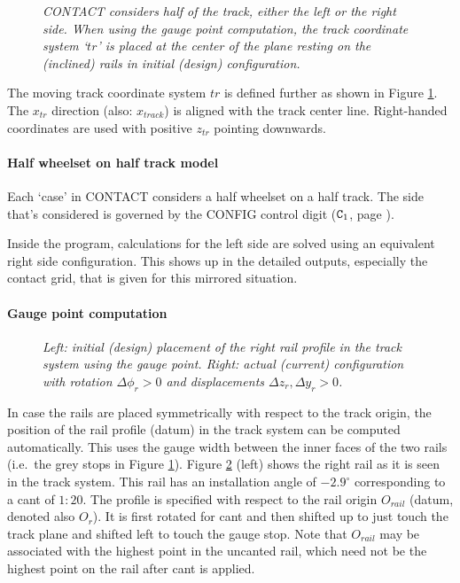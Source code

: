 \documentclass[12pt]{report}
\begin{document}
\begin{figure}[bt]
\centering
{}
\caption{\em CONTACT considers half of the track, either the left or the
        right side. When using the gauge point computation, the track
        coordinate system `$tr$' is placed at the center of the plane resting
        on the (inclined) rails in initial (design) configuration.}
\label{fig:track_coords}
\end{figure}

The moving track coordinate system $tr$ is defined further as shown in
Figure \ref{fig:track_coords}. The $x_{tr}$ direction (also: $x_{track}$) is
aligned with the track center line. Right-handed coordinates are used with
positive $z_{tr}$ pointing downwards.

\paragraph{Half wheelset on half track model}

Each `case' in CONTACT considers a half wheelset on a half track. The side
that's considered is governed by the CONFIG control digit (${\tt C}_1$,
page \pageref{c1-digit}).

Inside the program, calculations for the left side are solved using
an equivalent right side configuration. This shows up in the detailed
outputs, especially the contact grid, that is given for this mirrored
situation.

\paragraph{Gauge point computation}

\begin{figure}[bt]
\centering
{}
\caption{\em Left: initial (design) placement of the right rail profile in
        the track system using the gauge point. Right: actual
        (current) configuration with rotation $\Delta\phi_{r}>0$ and
        displacements $\Delta z_{r}, \Delta y_{r}>0$.}
\label{fig:rail_coords}
\end{figure}

In case the rails are placed symmetrically with respect to the track
origin, the position of the rail profile (datum) in the track system can
be computed automatically. This uses the gauge width between the inner
faces of the two rails (i.e.\ the grey stops in Figure
\ref{fig:track_coords}).  Figure \ref{fig:rail_coords} (left) shows the
right rail as it is seen in the track system. This rail has an installation
angle of $-2.9^\circ$ corresponding to a cant of $1:20$. The profile is
specified with respect to the rail origin $O_{rail}$ (datum, denoted also
$O_{r}$). It is first rotated for cant and then shifted up to just touch
the track plane and shifted left to touch the gauge stop. Note that
$O_{rail}$ may be associated with the highest point in the uncanted rail,
which need not be the highest point on the rail after cant is applied.
\end{document}
